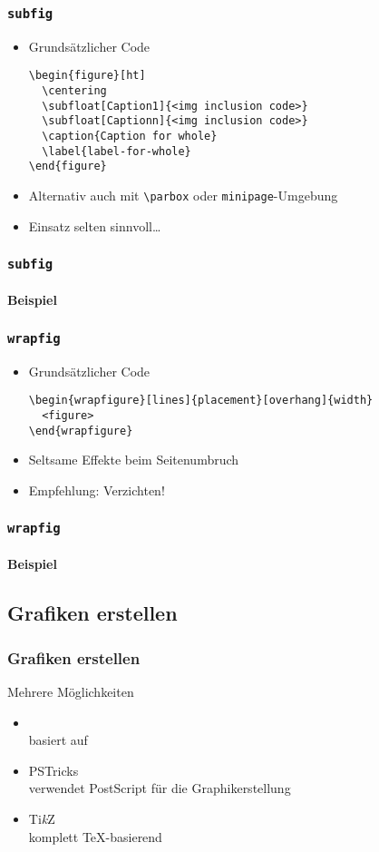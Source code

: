 \begin{frame}[fragile]
  \frametitle{\texttt{subfig}}
  \begin{itemize}
  \item Grundsätzlicher Code
\begin{lstlisting}[language={[LaTeX]TeX}]
\begin{figure}[ht]
  \centering
  \subfloat[Caption1]{<img inclusion code>}
  \subfloat[Captionn]{<img inclusion code>}
  \caption{Caption for whole}
  \label{label-for-whole}
\end{figure}
\end{lstlisting}
  \item Alternativ auch mit \texttt{\textbackslash parbox} oder
    \texttt{minipage}-Umgebung
  \item Einsatz selten sinnvoll\dots
  \end{itemize}
\end{frame}

\begin{frame}
  \frametitle{\texttt{subfig}}
  \framesubtitle{Beispiel}
\end{frame}

\begin{frame}[fragile]
  \frametitle{\texttt{wrapfig}}
  \begin{itemize}
  \item Grundsätzlicher Code
\begin{lstlisting}[language={[LaTeX]TeX}]
\begin{wrapfigure}[lines]{placement}[overhang]{width}
  <figure>
\end{wrapfigure}
\end{lstlisting}
  \item Seltsame Effekte beim Seitenumbruch
  \item Empfehlung: Verzichten!
  \end{itemize}
\end{frame}

\begin{frame}
  \frametitle{\texttt{wrapfig}}
  \framesubtitle{Beispiel}
\end{frame}

\subsection{Grafiken erstellen}
\begin{frame}
  \frametitle{Grafiken erstellen}
  Mehrere Möglichkeiten
  \begin{itemize}
  \item {}\\
    basiert auf 
  \item PSTricks\\
    verwendet PostScript für die Graphikerstellung
  \item Ti\emph{k}Z\\
    komplett \TeX-basierend
  \end{itemize}
\end{frame}

